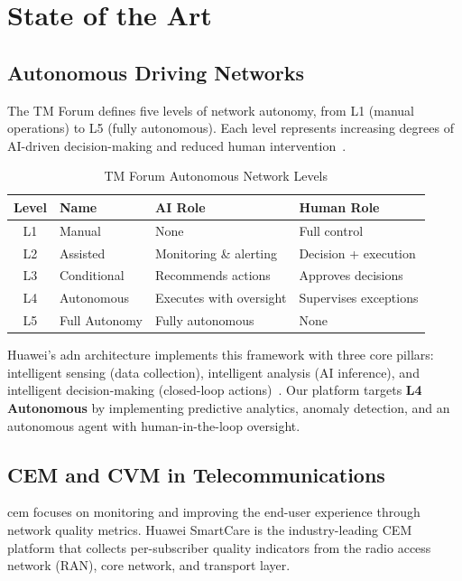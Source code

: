 \chapter{State of the Art}
\label{ch:state-of-art}

\section{Autonomous Driving Networks}

The TM Forum defines five levels of network autonomy, from L1 (manual operations) to L5 (fully autonomous). Each level represents increasing degrees of AI-driven decision-making and reduced human intervention~\cite{tmforum2023}.

\begin{table}[H]
\centering
\caption{TM Forum Autonomous Network Levels}
\label{tab:adn-levels}
\begin{tabular}{@{}clll@{}}
\toprule
\textbf{Level} & \textbf{Name} & \textbf{AI Role} & \textbf{Human Role} \\
\midrule
L1 & Manual & None & Full control \\
L2 & Assisted & Monitoring \& alerting & Decision + execution \\
L3 & Conditional & Recommends actions & Approves decisions \\
L4 & Autonomous & Executes with oversight & Supervises exceptions \\
L5 & Full Autonomy & Fully autonomous & None \\
\bottomrule
\end{tabular}
\end{table}

Huawei's \gls{adn} architecture implements this framework with three core pillars: intelligent sensing (data collection), intelligent analysis (AI inference), and intelligent decision-making (closed-loop actions)~\cite{huawei2022adn}. Our platform targets \textbf{L4 Autonomous} by implementing predictive analytics, anomaly detection, and an autonomous agent with human-in-the-loop oversight.

\section{CEM and CVM in Telecommunications}

\gls{cem} focuses on monitoring and improving the end-user experience through network quality metrics. Huawei SmartCare is the industry-leading CEM platform that collects per-subscriber quality indicators from the radio access network (RAN), core network, and transport layer.

